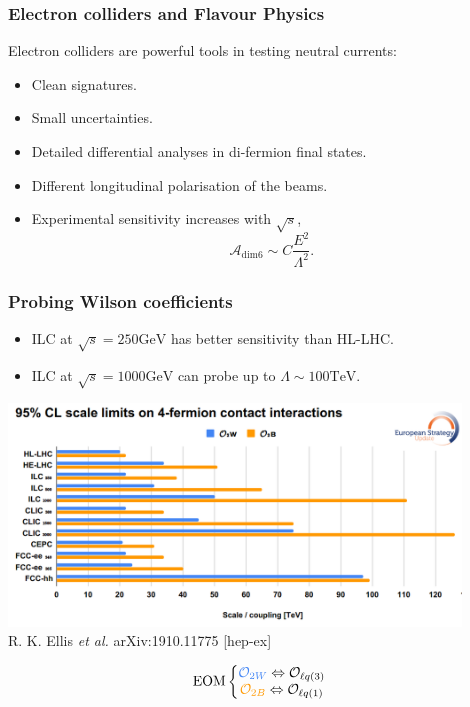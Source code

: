 \documentclass[mathserif, 10pt, dvipsnames]{beamer}
\newcommand\colorcite[1]{{\scriptsize\color{unizarblue}#1}}
\begin{document}
\begin{frame}
    \frametitle{Electron colliders and Flavour Physics}
    Electron colliders are powerful tools in testing neutral currents:
    \begin{itemize}
    \item Clean signatures.
    \item Small uncertainties.
    \item Detailed differential analyses in di-fermion final states.
    \item Different longitudinal polarisation of the beams.
    \item Experimental sensitivity increases with $\sqrt{s}$,
    $$\mathcal{A}_\mathrm{dim 6} \sim C \frac{E^2}{\Lambda^2}.$$
    \end{itemize}
\end{frame}
    
\begin{frame}
    \frametitle{Probing Wilson coefficients}
    \begin{itemize}
    \item ILC at $\sqrt{s} = 250 \mathrm{GeV}$ has better sensitivity than HL-LHC.
    \item ILC at $\sqrt{s} = 1000 \mathrm{GeV}$ can probe up to $\Lambda \sim 100 \mathrm{TeV}$.
    \end{itemize}
    \begin{center}
    \includegraphics[width=0.9\textwidth]{figures/operators_esu}\\
    \colorcite{R. K. Ellis \textit{et al.} arXiv:1910.11775 [hep-ex]}
    \end{center}
    $$\mathrm{EOM}\left\{ \begin{matrix}
    {\color[HTML]{4285f4} \mathcal{O}_{2W}} \Leftrightarrow \mathcal{O}_{\ell q(3)}\\ {\color[HTML]{ff9900} \mathcal{O}_{2B}} \Leftrightarrow \mathcal{O}_{\ell q(1)}
    \end{matrix} \right.  $$
\end{frame}
\end{document}
